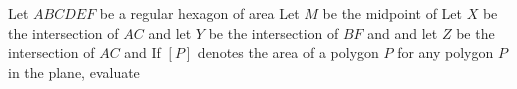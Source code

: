 Let $ABCDEF$ be a regular hexagon of area  Let $M$ be the midpoint of  Let $X$ be the intersection of $AC$ and  let $Y$ be the intersection of $BF$ and  and let $Z$ be the intersection of $AC$ and  If $[P]$ denotes the area of a polygon $P$ for any polygon $P$ in the plane, evaluate 